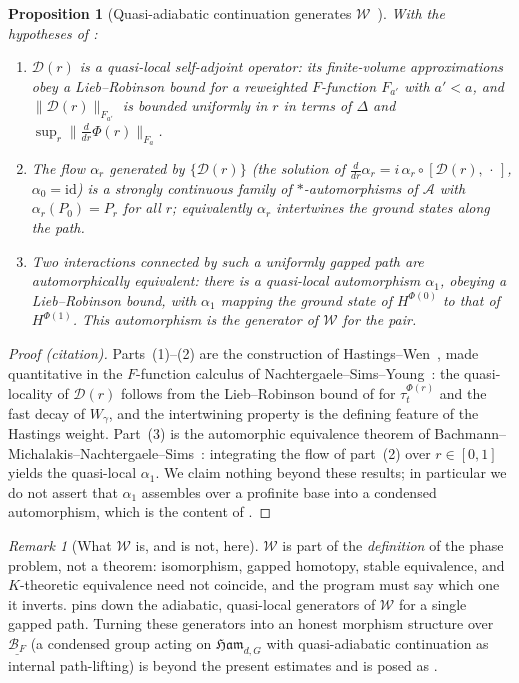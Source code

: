 \documentclass[12pt]{article}
\newcommand{\cond}[1]{\underline{#1}}          %
\newcommand{\Ffun}{F}                          %
\newcommand{\BF}{\mathcal{B}_{F}}              %
\newcommand{\Ham}{\mathfrak{Ham}}              %
\newcommand{\Weq}{\mathcal{W}}                 %
\newcommand{\gapbound}{\Delta}                  %
\newcommand{\qA}{\mathcal{A}}
\newcommand{\id}{\mathrm{id}}
\newcommand{\norm}[1]{\lVert #1\rVert}
\newcommand{\Fanorm}[1]{\lVert #1\rVert_{F_a}}
\newtheorem{proposition}[theorem]{Proposition}
\theoremstyle{definition}
\theoremstyle{remark}
\newtheorem{remark}[theorem]{Remark}
\begin{document}
\begin{proposition}[Quasi-adiabatic continuation generates $\Weq$~\cite{hastings-wen-qac,bmns-automorphic}]
\label{prop:qac}
With the hypotheses of :
\begin{enumerate}
\item $\mathcal D(r)$ is a quasi-local self-adjoint operator: its finite-volume
  approximations obey a Lieb--Robinson bound for a reweighted $\Ffun$-function
  $\Ffun_{a'}$ with $a'<a$, and $\norm{\mathcal D(r)}_{\Ffun_{a'}}$ is bounded uniformly in
  $r$ in terms of $\gapbound$ and $\sup_r\Fanorm{\tfrac{d}{dr}\Phi(r)}$.
\item The flow $\alpha_r$ generated by $\{\mathcal D(r)\}$ (the solution of
  $\tfrac{d}{dr}\alpha_r=i\,\alpha_r\circ[\mathcal D(r),\,\cdot\,]$, $\alpha_0=\id$) is a
  strongly continuous family of $*$-automorphisms of $\qA$ with $\alpha_r(P_0)=P_r$ for all
  $r$; equivalently $\alpha_r$ intertwines the ground states along the path.
\item Two interactions connected by such a uniformly gapped path are
  \emph{automorphically equivalent}: there is a quasi-local automorphism $\alpha_1$, obeying a
  Lieb--Robinson bound, with $\alpha_1$ mapping the ground state of $H^{\Phi(0)}$ to that of
  $H^{\Phi(1)}$. This automorphism is the generator of $\Weq$ for the pair.
\end{enumerate}
\end{proposition}
\begin{proof}[Proof (citation)]
Parts~(1)--(2) are the construction of Hastings--Wen~\cite{hastings-wen-qac}, made quantitative
in the $\Ffun$-function calculus of Nachtergaele--Sims--Young~\cite{nsy-quasilocality-1}: the
quasi-locality of $\mathcal D(r)$ follows from the Lieb--Robinson bound of 
for $\tau^{\Phi(r)}_t$ and the fast decay of $W_\gamma$, and the intertwining property is the
defining feature of the Hastings weight. Part~(3) is the automorphic equivalence theorem of
Bachmann--Michalakis--Nachtergaele--Sims~\cite{bmns-automorphic}: integrating the flow of
part~(2) over $r\in[0,1]$ yields the quasi-local $\alpha_1$. We claim nothing beyond these
results; in particular we do not assert that $\alpha_1$ assembles over a profinite base into a
condensed automorphism, which is the content of .
\end{proof}

\begin{remark}[What $\Weq$ is, and is not, here]
\label{rem:W}
$\Weq$ is part of the \emph{definition} of the phase problem, not a theorem: isomorphism,
gapped homotopy, stable equivalence, and $K$-theoretic equivalence need not coincide, and the
program must say which one it inverts.  pins down the adiabatic, quasi-local
generators of $\Weq$ for a single gapped path. Turning these generators into an honest
morphism structure over $\cond{\BF}$ (a condensed group acting on $\Ham_{d,G}$ with
quasi-adiabatic continuation as internal path-lifting) is beyond the present estimates and is
posed as .
\end{remark}
\end{document}
